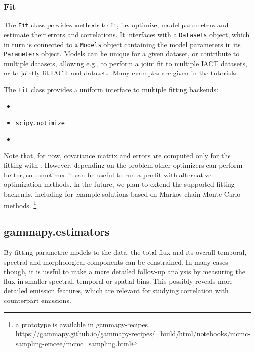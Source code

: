 \documentclass[longauth]{aa}
\newcommand{\code}[1]{\texttt{#1}}
\begin{document}
\subsubsection{Fit}
\label{sssec:fit}

The \code{Fit} class provides methods to fit, i.e. optimise, model parameters and estimate
their errors and correlations. It interfaces with a \code{Datasets} object, which
in turn is connected to a \code{Models} object containing the model parameters in its
\code{Parameters} object. Models can be unique for a given dataset, or contribute to
multiple datasets, allowing e.g., to perform a joint fit to
multiple IACT datasets, or to jointly fit IACT and \fermi datasets. Many
examples are given in the tutorials.

The \code{Fit} class provides a uniform interface to multiple fitting backends:
\begin{itemize}
	\setlength\itemsep{1em}
	\item \iminuit~\citep{iminuit}
	\item \code{scipy.optimize}~\citep{2020SciPy-NMeth}
	\item \sherpa~\citep{sherpa-2011, sherpa-2001}
\end{itemize}

Note that, for now, covariance matrix and errors are computed only for the fitting with 
\iminuit. However, depending on
the problem other optimizers can perform better, so sometimes it can be useful
to run a pre-fit with alternative optimization methods. In the future, we plan to
extend the supported fitting backends, including for example solutions based on Markov chain Monte Carlo methods.
\footnote{a prototype is available in gammapy-recipes,
	\url{https://gammapy.github.io/gammapy-recipes/_build/html/notebooks/mcmc-sampling-emcee/mcmc_sampling.html}
}

\subsection{gammapy.estimators}
\label{ssec:gammapy-estimators}
By fitting parametric models to the data, the total \gammaray
flux and its overall temporal, spectral and morphological components can be constrained.
In many cases though, it is useful to make a more detailed follow-up analysis by measuring the
flux in smaller spectral, temporal or spatial bins. This
possibly reveals more detailed emission features, which
are relevant for studying correlation with counterpart emissions.
\end{document}
